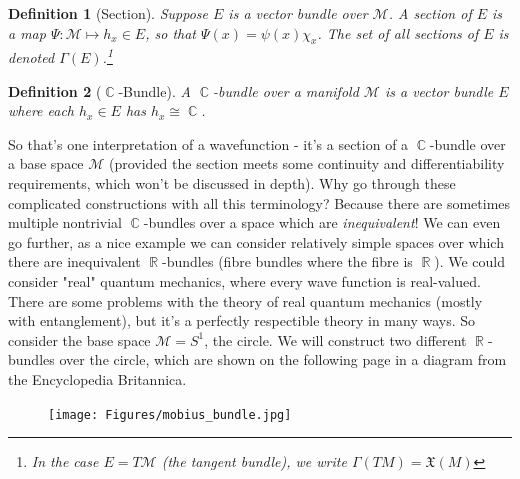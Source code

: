 \documentclass{article}
\DeclareMathOperator{\RR}{\mathbb{R}}
\DeclareMathOperator{\CC}{\mathbb{C}}
\newtheorem{defn}{Definition}
\begin{document}
\begin{defn}[Section]
	Suppose $E$ is a vector bundle over $\mathcal{M}$. A section of $E$ is a map $\Psi : \mathcal{M} \mapsto h_x \in E$, so that $\Psi(x) = \psi(x)\chi_x$. The set of all sections of $E$ is denoted $\Gamma(E)$.\footnote{In the case $E=T\mathcal{M}$ (the tangent bundle), we write $\Gamma(TM) = \mathfrak{X}(M)$}
\end{defn}

\begin{defn}[$\CC$-Bundle]
	A $\CC$-bundle over a manifold $\mathcal{M}$ is a vector bundle $E$ where each $h_x \in E$ has $h_x \cong \CC$.
\end{defn}

So that's one interpretation of a wavefunction - it's a section of a $\CC$-bundle over a base space $\mathcal{M}$ (provided the section meets some continuity and differentiability requirements, which won't be discussed in depth). Why go through these complicated constructions with all this terminology? Because there are sometimes multiple nontrivial $\CC$-bundles over a space which are \textit{inequivalent}! We can even go further, as a nice example we can consider relatively simple spaces over which there are inequivalent $\RR$-bundles (fibre bundles where the fibre is $\RR$). We could consider "real" quantum mechanics, where every wave function is real-valued. There are some problems with the theory of real quantum mechanics (mostly with entanglement), but it's a perfectly respectible theory in many ways. So consider the base space $\mathcal{M} = S^1$, the circle. We will construct two different $\RR$-bundles over the circle, which are shown on the following page in a diagram from the Encyclopedia Britannica.

\begin{figure}[h]
    \centering
    \texttt{[image: Figures/mobius\_bundle.jpg]}
    \caption*{}
    \label{fig:24}
\end{figure}
\end{document}
